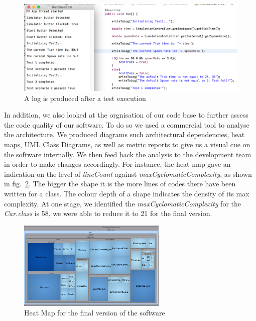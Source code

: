 \begin{figure}[h]
	\begin{center}
		\includegraphics[width=\textwidth]{img/testCase.png}
		\caption{A log is produced after a test execution}
		\label{fig:testCase}
	\end{center}
\end{figure}

In addition, we also looked at the orgnisation of our code base to further assess the code quality of our software.  To do so we used a commercial tool to analyse the architecture. We produced diagrams such architectural dependencies, heat maps, UML Class Diagrams, as well as metric reports to give us a visual cue on the software internally. We then feed back the analysis to the development team in order to make changes accordingly. For instance, the heat map gave an indication on the level of \textit{lineCount} against \textit{maxCyclomaticComplexity}, as shown in fig.~\ref{fig:heatmap}. The bigger the shape it is the more lines of codes there have been written for a class. The colour depth of a shape indicates the density of its max complexity. At one stage, we identified the \textit{maxCyclomaticComplexity} for the \textit{Car.class} is 58, we were able to reduce it to 21 for the final version.     

\begin{figure}[h]
\begin{minipage}{\textwidth}
	\begin{center}
			\includegraphics[width=71mm,keepaspectratio ]{img/heatmap.png}
		\caption{Heat Map for the final version of the software}
		\label{fig:heatmap}
	\end{center}
	\end{minipage}
\end{figure}

